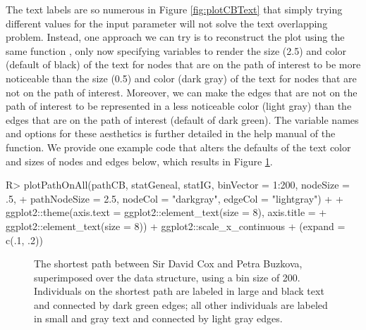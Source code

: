\documentclass[article,shortnames]{jss}
\begin{document}
The text labels are so numerous in Figure \ref{fig:plotCBText} that simply trying different values for the input parameter  will not solve the text overlapping problem. Instead, one approach we can try is to reconstruct the plot using the same  function , only now specifying variables to render the size (2.5) and color (default of black) of the text for nodes that are on the path of interest to be more noticeable than the size (0.5) and color (dark gray) of the text for nodes that are not on the path of interest. Moreover, we can make the edges that are not on the path of interest to be represented in a less noticeable color (light gray) than the edges that are on the path of interest (default of dark green). The variable names and options for these aesthetics is further detailed in the help manual of the function. We provide one example code that alters the defaults of the text color and sizes of nodes and edges below, which results in Figure \ref{fig:plotCBNoText}.

\begin{CodeChunk}
\begin{CodeInput}
R> plotPathOnAll(pathCB, statGeneal, statIG, binVector = 1:200, nodeSize = .5,
+    pathNodeSize = 2.5, nodeCol = "darkgray", edgeCol = "lightgray") +
+    ggplot2::theme(axis.text = ggplot2::element_text(size = 8), axis.title =
+    ggplot2::element_text(size = 8)) + ggplot2::scale_x_continuous
+    (expand = c(.1, .2))
\end{CodeInput}
\end{CodeChunk}

\begin{figure}[H]
    \centering
    \caption{The shortest path between Sir David Cox and Petra Buzkova, superimposed over the data structure, using a bin size of 200. Individuals on the shortest path are labeled in large and black text and connected by dark green edges; all other individuals are labeled in small and gray text and connected by light gray edges.}
    \label{fig:plotCBNoText}
\end{figure}
\end{document}
